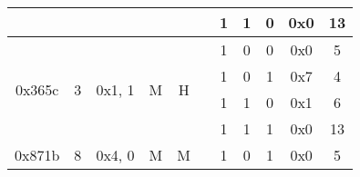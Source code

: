 \documentclass[11pt]{homework}
\newcommand{\cmark}{\ding{51}}%
\newcommand{\xmark}{\ding{55}}%
\begin{document}
\begin{arabicparts}
{\begin{tabular}{|c|c|c|c|c|c|c|c|c|c|c|}
            \cline{7-11}
                                     &                                                                        &                             &                                                                   &                                                                    &                                                                      & 1                        & 1     & 0         & 0x0 & 13            \\
            \hline
            \multirow{4}{*}{0x365c}  & \multirow{4}{*}{3}                                                     & \multirow{4}{*}{0x1, 1}     & \multirow{4}{*}{M}                                                & \multirow{4}{*}{H}                                                 & \multirow{4}{*}{\xmark}                                              & 1                        & 0     & 0         & 0x0 & 5             \\
            \cline{7-11}
                                     &                                                                        &                             &                                                                   &                                                                    &                                                                      & 1                        & 0     & 1         & 0x7 & 4             \\
            \cline{7-11}
                                     &                                                                        &                             &                                                                   &                                                                    &                                                                      & 1                        & 1     & 0         & 0x1 & 6             \\
            \cline{7-11}
                                     &                                                                        &                             &                                                                   &                                                                    &                                                                      & 1                        & 1     & 1         & 0x0 & 13            \\
            \hline
            \multirow{4}{*}{0x871b}  & \multirow{4}{*}{8}                                                     & \multirow{4}{*}{0x4, 0}     & \multirow{4}{*}{M}                                                & \multirow{4}{*}{M}                                                 & \multirow{4}{*}{\cmark}                                              & 1                        & 0     & 1         & 0x0 & 5             \\

\end{tabular}}
\end{arabicparts}
\end{document}
